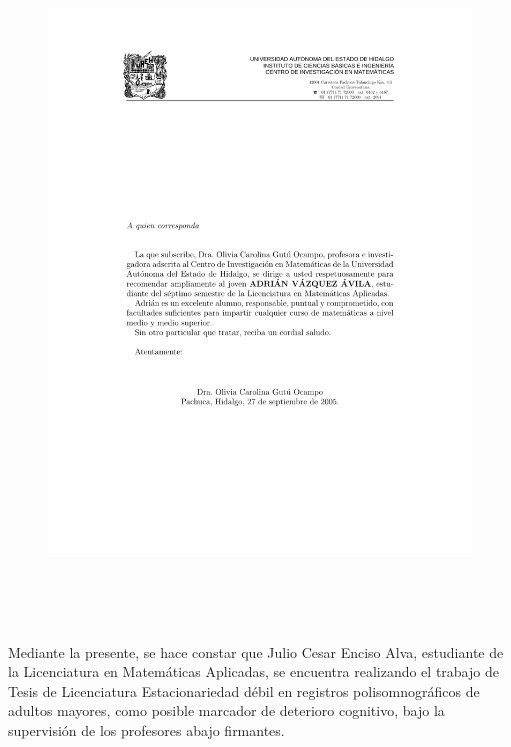 \documentclass[12pt]{article}
\begin{document}
\thispagestyle{empty}

\begin{figure}
\begin{center}
\includegraphics{encabezado.pdf}
\end{center}
\end{figure}

\begin{center}
\end{center}




\

\

Mediante la presente, se hace constar que  {\sc Julio Cesar Enciso Alva}, estudiante de la Licenciatura en
Matem\'aticas Aplicadas, se encuentra realizando el trabajo de Tesis de Licenciatura
{\sc Estacionariedad d\'ebil en registros polisomnogr\'aficos de adultos mayores,
como posible marcador de deterioro cognitivo}, bajo la supervisi\'on de los profesores abajo firmantes.
\medskip
\end{document}
